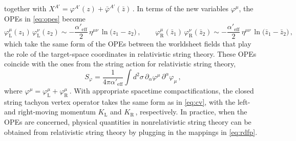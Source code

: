 \documentclass[11pt]{article}
\newcommand{\be}{\begin{equation}}
\newcommand{\ee}{\end{equation}}
\newcommand{\p}{\partial}
\begin{document}
%
together with $X^{A'} = \varphi^{A'} (z) + \bar{\varphi}^{A'} (\bar{z})$\,. 
In terms of the new variables $\varphi^\mu$, the OPEs in \eqref{eq:opes} become
%
\be
    \varphi^\mu_\text{L} (z_1) \, \varphi^{\nu}_\text{L} (z_2) \sim - \frac{\alpha'_\text{eff}}{2} \, \eta^{\mu\nu} \, \ln \bigl( z_1- z_2 \bigr)\,,
        \qquad%
    \varphi_\text{R}^\mu(\bar{z}_1) \, \varphi_\text{R}^{\nu} (\bar{z}_2) \sim - \frac{\alpha'_\text{eff}}{2} \, \eta^{\mu\nu} \, \ln \bigl( \bar{z}_1 - \bar{z}_2 \bigr)\,,
\ee
%
which take the same form of the OPEs between the worldsheet fields that play the role of the target-space coordinates in relativistic string theory. These OPEs coincide with the ones from the string action for relativistic string theory,
%
\be \label{eq:sphi}
    S_\varphi = \frac{1}{4\pi\alpha'_\text{eff}} \int d^2 \sigma \, \p_\alpha \varphi^\mu \, \p^\alpha \varphi_\mu\,,
\ee
%
where $\varphi^\mu = \varphi^\mu_\text{L} + \varphi^\mu_\text{R}$\,. With appropriate spacetime compactifications, the closed string tachyon vertex operator takes the same form as in \eqref{eq:cv}, with the left- and right-moving momentum $K_\text{L}$ and $K_\text{R}$\,, respectively.  
In practice, when the OPEs are concerned, physical quantities in nonrelativistic string theory can be obtained from relativistic string theory by plugging in the mappings in \eqref{eq:rdfp}. 
\end{document}
